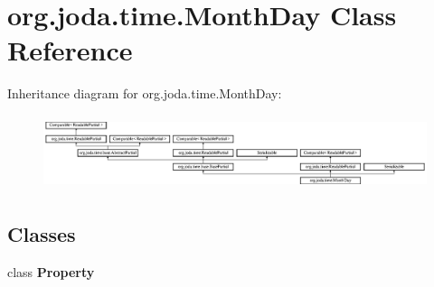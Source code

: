 \hypertarget{classorg_1_1joda_1_1time_1_1_month_day}{\section{org.\-joda.\-time.\-Month\-Day Class Reference}
\label{classorg_1_1joda_1_1time_1_1_month_day}
}
Inheritance diagram for org.\-joda.\-time.\-Month\-Day\-:\begin{figure}[H]
\begin{center}
\leavevmode
\includegraphics[height=2.211690cm]{classorg_1_1joda_1_1time_1_1_month_day}
\end{center}
\end{figure}
\subsection*{Classes}
\begin{DoxyCompactItemize}
\item 
class {\bfseries Property}
\end{DoxyCompactItemize}
